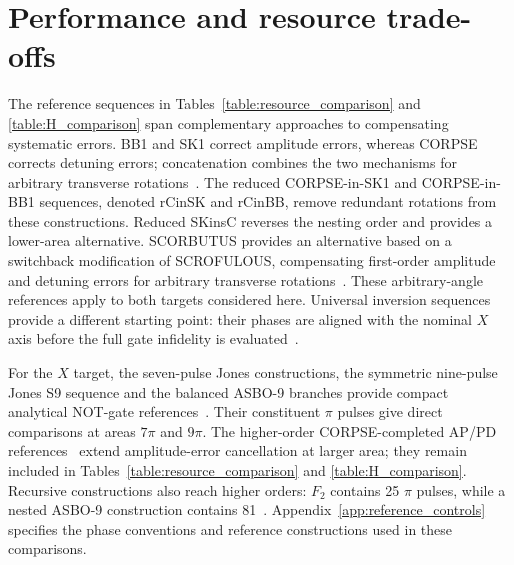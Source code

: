 \documentclass[10pt,aps,twocolumn,pra,floatfix,superscriptaddress]{revtex4-2}
\begin{document}
\begin{table}[tp]
\caption{Hadamard-primitive performance at common peak nominal Rabi frequency. $\mathcal R_A=\Phi/\theta$ uses $\theta=\pi/2$, and $N$ counts the constituent rotations in a given sequence. Means, sampled maxima and $f_4(0.15)$ refer to $B_{0.15}$; $f_4^{(0)}(0.5)$ is the fraction of $B_{0.5}$ occupied by a connected region with $\mathcal I\leq10^{-4}$. The two fractions use different, explicitly specified domains. Means and fractions use $801\times801$ midpoint grids, with boundaries additionally checked for maxima. All entries use the full-precision controls. The AP entries are the published branches with the lowest independently evaluated mean at each amplitude order. }
\label{table:H_comparison}
\end{table}

\section{Performance and resource trade-offs}
\label{Sec:objective_selection}
\label{Sec:nominal_tradeoffs}

The reference sequences in
Tables~\ref{table:resource_comparison} and
\ref{table:H_comparison} span complementary approaches
to compensating systematic errors. BB1 and SK1 correct amplitude errors, whereas CORPSE corrects detuning errors; concatenation combines the two mechanisms for arbitrary transverse rotations~\cite{NRPBCP,Brown_2004,Cummins_2003,Bando_2013}. The reduced CORPSE-in-SK1 and CORPSE-in-BB1 sequences, denoted rCinSK and rCinBB, remove redundant rotations from these constructions. Reduced SKinsC reverses the nesting order and provides a lower-area alternative. SCORBUTUS provides an alternative based on
a switchback modification of SCROFULOUS, compensating
first-order amplitude and detuning errors for arbitrary
transverse rotations~\cite{Kukita_2022_switchback}. These arbitrary-angle references apply to both targets considered here. Universal inversion sequences provide a different starting point: their phases are aligned with the nominal $X$ axis before the full gate infidelity is evaluated~\cite{PhysRevLett.113.043001,Genov_2020_profile}.

For the $X$ target, the seven-pulse Jones constructions, the symmetric nine-pulse Jones S9 sequence and the balanced ASBO-9 branches provide compact analytical NOT-gate references~\cite{Jones_2013_NOT,Odedra_2012}. Their constituent $\pi$ pulses give direct comparisons at areas $7\pi$ and $9\pi$. The higher-order CORPSE-completed AP/PD references~\cite{arbitraryCp} extend amplitude-error cancellation at larger area; they remain included in Tables~\ref{table:resource_comparison} and \ref{table:H_comparison}. Recursive constructions also reach higher orders: $F_2$ contains 25 $\pi$ pulses, while a nested ASBO-9 construction contains 81~\cite{Jones_2013_nested}. Appendix~\ref{app:reference_controls} specifies the phase conventions and reference constructions used in these comparisons.
\end{document}
